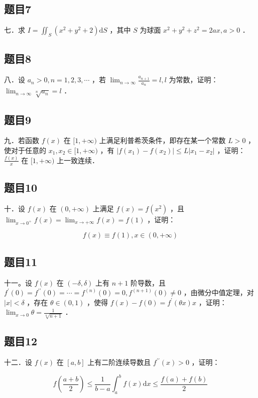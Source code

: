 \documentclass{article}
\begin{document}
\subsection{题目7}
七．求 \(I=\iint_{S}\left(x^{2}+y^{2}+2\right) \mathrm{d} S\) ，其中 \(S\) 为球面 \(x^{2}+y^{2}+z^{2}=2 a x, a>0\) ．

\subsection{题目8}
八．设 \(a_{n}>0, n=1,2,3, \cdots\) ，若 \(\lim _{n \rightarrow \infty} \frac{a_{n+1}}{a_{n}}=l, l\) 为常数，证明： \(\lim _{n \rightarrow \infty} \sqrt[n]{a_{n}}=l\) ．

\subsection{题目9}
九．若函数 \(f(x)\) 在 \([1,+\infty)\) 上满足利普希茨条件，即存在某一个常数 \(L>0\) ，使对于任意的 \(x_{1}, x_{2} \in [1,+\infty)\) ，有 \(\left|f\left(x_{1}\right)-f\left(x_{2}\right)\right| \leq L\left|x_{1}-x_{2}\right|\) ，证明：\(\frac{f(x)}{x}\) 在 \([1,+\infty)\) 上一致连续．

\subsection{题目10}
十．设 \(f(x)\) 在 \((0,+\infty)\) 上满足 \(f(x)=f\left(x^{2}\right)\) ，且 \(\lim _{x \rightarrow 0^{+}} f(x)=\lim _{x \rightarrow+\infty} f(x)=f(1)\) ，证明：

\[
f(x) \equiv f(1), x \in(0,+\infty)
\]

\subsection{题目11}
十一。设 \(f(x)\) 在 \((-\delta, \delta)\) 上有 \(n+1\) 阶导数，且 \(f^{\prime}(0)=f^{\prime \prime}(0)=\cdots=f^{(n)}(0)=0, f^{(n+1)}(0) \neq 0\) ，由微分中值定理，对 \(|x|<\delta\) ，存在 \(\theta \in(0,1)\) ，使得 \(f(x)-f(0)=f^{\prime}(\theta x) x\) ，证明： \(\lim _{x \rightarrow 0} \theta=\frac{1}{\sqrt[n]{n+1}}\) ．

\subsection{题目12}
十二．设 \(f(x)\) 在 \([a, b]\) 上有二阶连续导数且 \(f^{\prime \prime}(x)>0\) ，证明：

\[
f\left(\frac{a+b}{2}\right) \leq \frac{1}{b-a} \int_{a}^{b} f(x) \mathrm{d} x \leq \frac{f(a)+f(b)}{2}
\]
\end{document}
